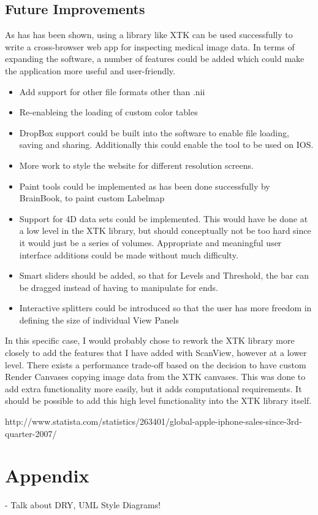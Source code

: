 \documentclass[a4paper,11pt,titlepage]{article}
\begin{document}
\subsection{Future Improvements}

As has has been shown, using a library like XTK can be used successfully to write a cross-browser web app for inspecting medical image data. In terms of expanding the software, a number of features could be added which could make the application more useful and user-friendly.

\begin{itemize}
\item Add support for other file formats other than .nii
\item Re-enableing the loading of custom color tables
\item DropBox support could be built into the software to enable file loading, saving and sharing. Additionally this could enable the tool to be used on IOS.
\item More work to style the website for different resolution screens.
\item Paint tools could be implemented as has been done successfully by BrainBook, to paint custom Labelmap
\item Support for 4D data sets could be implemented. This would have be done at a low level in the XTK library, but should conceptually not be too hard since it would just be a series of volumes. Appropriate and meaningful user interface additions could be made without much difficulty.
\item Smart sliders should be added, so that for Levels and Threshold, the bar can be dragged instead of having to manipulate for ends.
\item Interactive splitters could be introduced so that the user has more freedom in defining the size of individual View Panels
\end{itemize}


In this specific case, I would probably chose to rework the XTK library more closely to add the features that I have added with ScanView, however at a lower level. There exists a performance trade-off based on the decision to have custom Render Canvases copying image data from the XTK canvases. This was done to add extra functionality more easily, but it adds computational requirements. It should be possible to add this high level functionality into the XTK library itself.










\newpage

\begin{thebibliography}{1}


http://www.statista.com/statistics/263401/global-apple-iphone-sales-since-3rd-quarter-2007/

\end{thebibliography}

\newpage

\section{Appendix}



- Talk about DRY, UML Style Diagrams!
\end{document}
